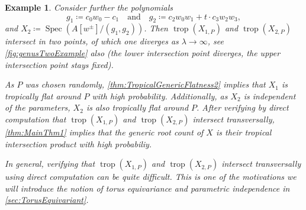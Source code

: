 \documentclass[12pt,reqno,a4paper]{amsart}
\theoremstyle{theoremstyle}
\theoremstyle{examplestyle}
\newtheorem{example}[theorem]{Example}
\theoremstyle{algorithmstyle}
\DeclareMathOperator{\Spec}{Spec}
\DeclareMathOperator{\Trop}{trop}
\begin{document}
\begin{example}
  Consider further the polynomials
  \begin{equation*}
    g_1\coloneqq c_0w_0-c_1\quad \text{and}\quad g_2\coloneqq c_2w_0w_1+t\cdot c_3w_2w_3,
  \end{equation*}
  and $X_2\coloneqq\Spec(A[w^\pm]/(g_1,g_2))$. Then $\Trop(X_{1,P})$ and $\Trop(X_{2,P})$ intersect in two points, of which one diverges as $\lambda\rightarrow\infty$, see \cref{fig:genusTwoExample} also (the lower intersection point diverges, the upper intersection point stays fixed).

  As $P$ was chosen randomly, \cref{thm:TropicalGenericFlatness2} implies that $X_1$ is tropically flat around $P$ with high probability. Additionally, as $X_{2}$ is independent of the parameters, $X_2$ is also tropically flat around $P$.  After verifying by direct computation that $\Trop(X_{1,P})$ and $\Trop(X_{2,P})$ intersect transversally, \cref{thm:MainThm1} implies that the generic root count of $X$ is their tropical intersection product with high probabiliy.

  In general, verifying that $\Trop(X_{1,P})$ and $\Trop(X_{2,P})$ intersect transversally using direct computation can be quite difficult. This is one of the motivations we will introduce the notion of torus equivariance and parametric independence in \cref{sec:TorusEquivariant}.
\end{example}
\end{document}
